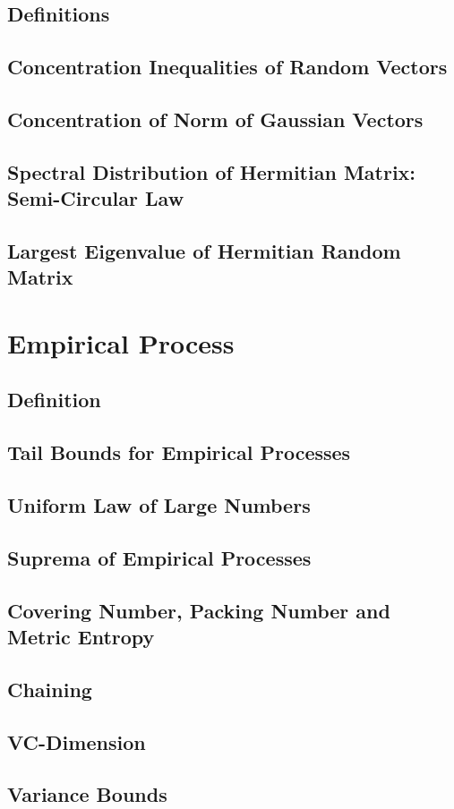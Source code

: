 \documentclass[11pt]{article}
\begin{document}
\subsection{Definitions}
\subsection{Concentration Inequalities of Random Vectors}
\subsection{Concentration of Norm of Gaussian Vectors}
\subsection{Spectral Distribution of Hermitian Matrix: Semi-Circular Law}
\subsection{Largest Eigenvalue of  Hermitian Random Matrix}


\section{Empirical Process}
\subsection{Definition}
\subsection{Tail Bounds for Empirical Processes}
\subsection{Uniform Law of Large Numbers}
\subsection{Suprema of Empirical Processes}
\subsection{Covering Number, Packing Number and Metric Entropy}
\subsection{Chaining}
\subsection{VC-Dimension}
\subsection{Variance Bounds}




\newpage


\end{document}
